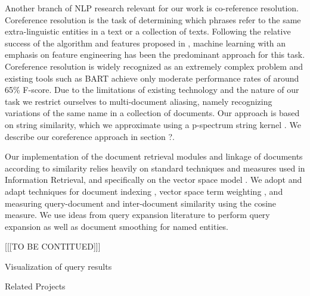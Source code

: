 Another branch of NLP research relevant for our work is co-reference resolution. Coreference resolution is the task of determining which phrases refer to the same extra-linguistic entities in a text or a collection of texts. Following the relative success of the algorithm and features proposed in \cite {soon2001coreference}, machine learning with an emphasis on feature engineering has been the predominant approach for this task. Coreference resolution is widely recognized as an extremely complex problem and existing tools such as BART \cite{bart} achieve only moderate performance rates of around 65\% F-score. Due to the limitations of existing technology and the nature of our task we restrict ourselves to multi-document aliasing, namely recognizing variations of the same name in a collection of documents. Our approach is based on string similarity, which we approximate using a p-spectrum string kernel \cite{kernels2004}. We describe our coreference approach in section ?.

Our implementation of the document retrieval modules and linkage of documents according to similarity relies heavily on standard techniques and measures used in Information Retrieval, and  specifically on the vector space model \cite{ir2008}. We adopt and adapt techniques for document indexing \cite{indexing1999}, vector space term weighting \cite{jones2004}, \cite{salton1971} and measuring query-document and inter-document similarity using the cosine measure. We use ideas from query expansion literature \cite{xu1996} to perform query expansion as well as document smoothing for named entities. 

[[[TO BE CONTITUED]]]

Visualization of query results

Related Projects 

